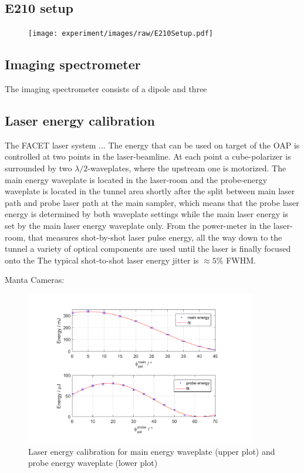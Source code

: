 \subsection{E210 setup}
\begin{figure}[htbp]
\texttt{[image: experiment/images/raw/E210Setup.pdf]}
\caption{}
\label{img:E210_Setup}
\end{figure}


\subsection{Imaging spectrometer}
The imaging spectrometer consists of a dipole and three 
\subsection{Laser energy calibration}
The FACET laser system ...
The energy that can be used on target of the OAP is controlled at two points in the laser-beamline.
At each point a cube-polarizer is surrounded by two  $\lambda/2$-waveplates, where the upstream one is motorized.
The main energy waveplate is located in the laser-room and the probe-energy waveplate is located in the tunnel area shortly after the split between main laser path and probe laser path at the main sampler, which means that the probe laser energy is determined by both waveplate settings while the main laser energy is set by the main laser energy waveplate only. From the power-meter in the laser-room, that measures shot-by-shot laser pulse energy, all the way down to the tunnel a variety of optical components are used until the laser is finally focused onto the 
The typical shot-to-shot laser energy jitter  is $\approx 5 \%$ FWHM.

Manta Cameras: \cite{GigE125_datasheet}

\begin{figure}[htbp]
\includegraphics[width=0.9\textwidth]{experiment/images/edited/waveplate_calibration.pdf}
\caption{Laser energy calibration for main energy waveplate (upper plot) and probe energy waveplate (lower plot)}
\label{img:LaserEnergyCalib}
\end{figure}

